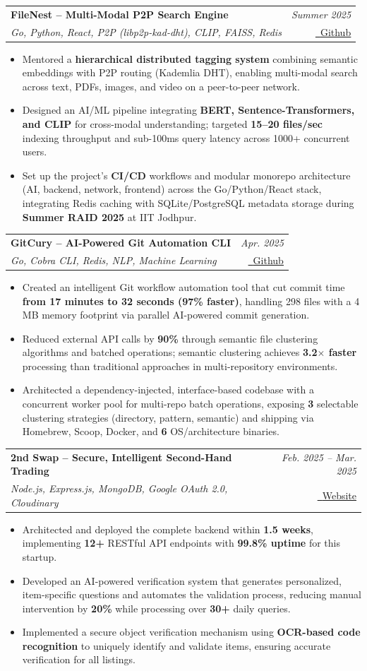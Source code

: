 \documentclass[letterpaper,10pt]{article}
\makeatletter
\newcommand{\resumeItem}[1]{
  \item\small{
    {#1 \vspace{-1mm}}
  }
}
\newcommand{\resumeProject}[4]{
  \item
    \begin{tabular*}{0.97\textwidth}[t]{l@{\extracolsep{\fill}}r}
      \textbf{\small #1} & \textit{\small #3} \\
      \textit{\small #2} & \small #4 \\
    \end{tabular*}\vspace{-7pt}
}
\newcommand{\resumeItemListStart}{\begin{itemize}}
\newcommand{\resumeItemListEnd}{\end{itemize}\vspace{-5pt}}
\makeatother
\begin{document}
      \resumeProject
        {FileNest -- Multi-Modal P2P Search Engine}
        {Go, Python, React, P2P (libp2p-kad-dht), CLIP, FAISS, Redis}
        {Summer 2025}
        {\href{https://github.com/lakshyajain-0291/FileNest}{\faGithub \ \underline{Github}}}
        \resumeItemListStart
          \resumeItem{Mentored a \textbf{hierarchical distributed tagging system} combining semantic embeddings with P2P routing (Kademlia DHT), enabling multi-modal search across text, PDFs, images, and video on a peer-to-peer network.}
          \resumeItem{Designed an AI/ML pipeline integrating \textbf{BERT, Sentence-Transformers, and CLIP} for cross-modal understanding; targeted \textbf{15--20 files/sec} indexing throughput and sub-100ms query latency across 1000+ concurrent users.}
          \resumeItem{Set up the project's \textbf{CI/CD} workflows and modular monorepo architecture (AI, backend, network, frontend) across the Go/Python/React stack, integrating Redis caching with SQLite/PostgreSQL metadata storage during \textbf{Summer RAID 2025} at IIT Jodhpur.}
        \resumeItemListEnd

      \resumeProject
        {GitCury -- AI-Powered Git Automation CLI}
        {Go, Cobra CLI, Redis, NLP, Machine Learning}
        {Apr. 2025}
        {\href{https://github.com/lakshyajain-0291/GitCury}{\faGithub \ \underline{Github}}}
        \resumeItemListStart
          \resumeItem{Created an intelligent Git workflow automation tool that cut commit time \textbf{from 17 minutes to 32 seconds (97\% faster)}, handling 298 files with a 4 MB memory footprint via parallel AI-powered commit generation.}
          \resumeItem{Reduced external API calls by \textbf{90\%} through semantic file clustering algorithms and batched operations; semantic clustering achieves \textbf{3.2$\times$ faster} processing than traditional approaches in multi-repository environments.}
          \resumeItem{Architected a dependency-injected, interface-based codebase with a concurrent worker pool for multi-repo batch operations, exposing \textbf{3} selectable clustering strategies (directory, pattern, semantic) and shipping via Homebrew, Scoop, Docker, and \textbf{6} OS/architecture binaries.}
        \resumeItemListEnd

      \resumeProject
        {2nd Swap -- Secure, Intelligent Second-Hand Trading}
        {Node.js, Express.js, MongoDB, Google OAuth 2.0, Cloudinary}
        {Feb. 2025 -- Mar. 2025}
        {\href{https://www.2ndswap.in/}{\faGlobe \ \underline{Website}}}
        \resumeItemListStart
          \resumeItem{Architected and deployed the complete backend within \textbf{1.5 weeks}, implementing \textbf{12+} RESTful API endpoints with \textbf{99.8\% uptime} for this startup.}
          \resumeItem{Developed an AI-powered verification system that generates personalized, item-specific questions and automates the validation process, reducing manual intervention by \textbf{20\%} while processing over \textbf{30+} daily queries.}
          \resumeItem{Implemented a secure object verification mechanism using \textbf{OCR-based code recognition} to uniquely identify and validate items, ensuring accurate verification for all listings.}
        \resumeItemListEnd
\end{document}
